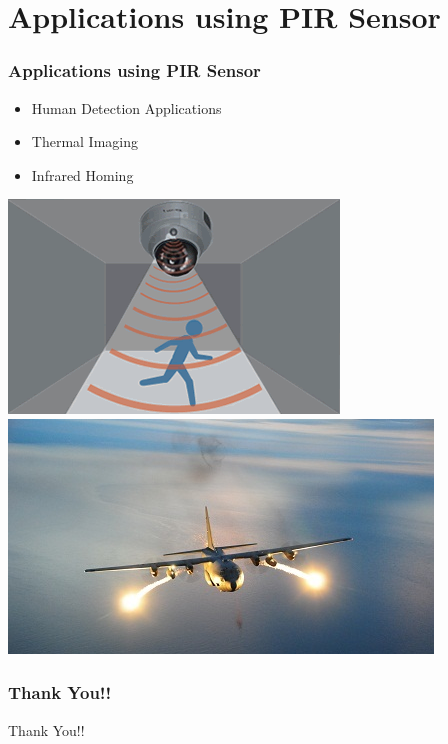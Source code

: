 \documentclass[table,10pt,red]{beamer}	%
\begin{document}
\section{Applications using PIR Sensor}
\begin{frame}
	\frametitle{Applications using PIR Sensor}
\pause
	\begin{minipage}[c]{0.45\textwidth}
\begin{itemize}
\item <+-|alert@+> Human Detection Applications
\item <+-|alert@+> Thermal Imaging
\item <+-|alert@+> Infrared Homing

\end{itemize}
		\end{minipage}
\begin{minipage}[c]{0.52\textwidth}

			\includegraphics[width=\linewidth]{pirapp.png}\\
\pause
	\includegraphics[width=\linewidth]{6727973.jpg}

		\end{minipage}


		
\end{frame}

\begin{frame}
	\frametitle{Thank You!!}
\pause
		\begin{center}
\large Thank You!!
\end{center}
\end{frame}
\end{document}
